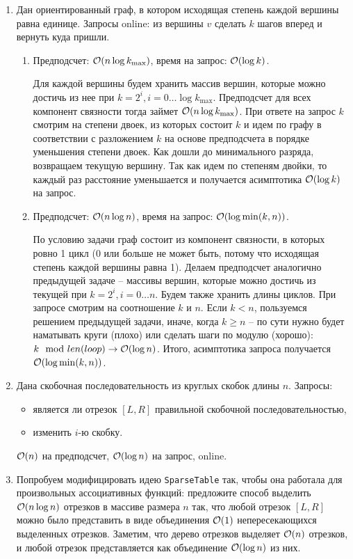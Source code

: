 \begin{enumerate}
  \item
    Дан ориентированный граф, в котором исходящая степень каждой вершины
	равна единице. Запросы online: из вершины $v$ сделать $k$ шагов вперед и вернуть куда пришли.
	\begin{enumerate}
	  \item Предподсчет: $\mathcal{O}(n \log k_{\max})$, время на запрос: $\mathcal{O}(\log k)$.
	  \begin{solution}
		Для каждой вершины будем хранить массив вершин, которые можно достичь из нее при $k=2^i, i = 0 \ldots \log k_{\max}$. Предподсчет для всех компонент связности тогда займет $\mathcal{O}(n \log k_{\max})$. При ответе на запрос $k$ смотрим на степени двоек, из которых состоит $k$ и идем по графу в соответствии с разложением $k$ на основе предподсчета в порядке уменьшения степени двоек. Как дошли до минимального разряда, возвращаем текущую вершину. Так как идем по степеням двойки, то каждый раз расстояние уменьшается и получается асимптотика $\mathcal{O}(\log k)$ на запрос.
	  \end{solution}
	  \item Предподсчет: $\mathcal{O}(n \log n)$, время на запрос: $\mathcal{O}(\log \min(k, n))$.      
	  \begin{solution}
		По условию задачи граф состоит из компонент связности, в которых ровно 1 цикл (0 или больше не может быть, потому что исходящая степень каждой вершины равна 1). Делаем предподсчет аналогично предыдущей задаче -- массивы вершин, которые можно достичь из текущей при $k=2^i, i = 0 \ldots n$. Будем также хранить длины циклов. При запросе смотрим на соотношение $k$ и $n$. Если $k < n$, пользуемся решением предыдущей задачи, иначе, когда $k \geq n$ -- по сути нужно будет наматывать круги (плохо) или сделать шаги по модулю (хорошо): $k \mod len(loop) \rightarrow \mathcal{O}(\log n)$. Итого, асимптотика запроса получается $\mathcal{O}(\log \min(k, n))$.
	  \end{solution}
	\end{enumerate}
	
  \item
	Дана скобочная последовательность из круглых скобок длины $n$. Запросы:
	\begin{itemize}
	    \item является ли отрезок $[L, R]$ правильной скобочной последовательностью,
	    \item изменить $i$-ю скобку.
	\end{itemize}
	$\mathcal{O}(n)$ на предподсчет, $\mathcal{O}(\log n)$ на запрос, online.

  \item
	Попробуем модифицировать идею \texttt{SparseTable} так, чтобы она работала для произвольных ассоциативных функций:
	предложите способ выделить $\mathcal{O}(n \log n)$ отрезков в массиве размера $n$ так, что любой
	отрезок $[L, R]$ можно было представить в виде объединения $\mathcal{O}(1)$ непересекающихся выделенных отрезков. 
	Заметим, что дерево отрезков выделяет $\mathcal{O}(n)$ отрезков, и любой отрезок
	представляется как объединение $\mathcal{O}(\log n)$ из них.


\end{enumerate}
